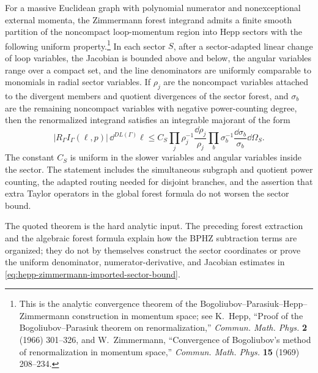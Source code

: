 \begin{quotedtheorem}
\label{qthm:hepp-zimmermann-sector-power-counting}
For a massive Euclidean graph with polynomial numerator and nonexceptional
external momenta, the Zimmermann forest integrand admits a finite smooth
partition of the noncompact loop-momentum region into Hepp sectors with the
following uniform property.\footnote{This is the analytic convergence theorem
of the Bogoliubov--Parasiuk--Hepp--Zimmermann construction in momentum space;
see K.~Hepp, ``Proof of the Bogoliubov--Parasiuk theorem on renormalization,''
\emph{Commun. Math. Phys.} \textbf{2} (1966) 301--326, and
W.~Zimmermann, ``Convergence of Bogoliubov's method of renormalization in
momentum space,'' \emph{Commun. Math. Phys.} \textbf{15} (1969) 208--234.}
In each sector \(S\), after a sector-adapted linear change of loop variables,
the Jacobian is bounded above and below, the angular variables range over a
compact set, and the line denominators are uniformly comparable to monomials
in radial sector variables.  If \(\rho_j\) are the noncompact variables attached
to the divergent members and quotient divergences of the sector forest, and
\(\sigma_b\) are the remaining noncompact variables with negative
power-counting degree, then the renormalized integrand satisfies an integrable
majorant of the form
\begin{equation}
  |R_\Gamma I_\Gamma(\ell,p)|\,\dd^{D L(\Gamma)}\ell
  \le
  C_S
  \prod_j
    \rho_j^{-1}\frac{\dd\rho_j}{\rho_j}
  \prod_b
    \sigma_b^{-1}\frac{\dd\sigma_b}{\sigma_b}
  \dd\Omega_S .
  \label{eq:hepp-zimmermann-imported-sector-bound}
\end{equation}
The constant \(C_S\) is uniform in the slower variables and angular variables
inside the sector.  The statement includes the simultaneous subgraph and
quotient power counting, the adapted routing needed for disjoint branches, and
the assertion that extra Taylor operators in the global forest formula do not
worsen the sector bound.
\end{quotedtheorem}

The quoted theorem is the hard analytic input.  The preceding forest extraction
and the algebraic forest formula explain how the BPHZ subtraction terms are
organized; they do not by themselves construct the sector coordinates or prove
the uniform denominator, numerator-derivative, and Jacobian estimates in
\eqref{eq:hepp-zimmermann-imported-sector-bound}.


